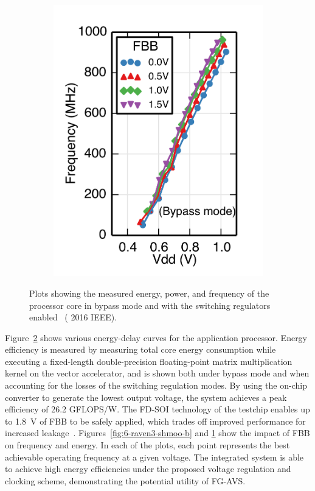 \documentclass[graybox]{svmult}
\begin{document}
\begin{figure}
\begin{subfigure}[t]{0.23\textwidth}
  \includegraphics[width=\textwidth]{6-raven3-shmoo-d}
  \caption{}
  \label{fig:6-raven3-shmoo-d}
  \end{subfigure}
  \hspace*{\fill}
  \caption{Plots showing the measured energy, power, and frequency of the processor core in bypass mode and with the switching regulators enabled~\cite{Zimmer2016} ({\textcopyright} 2016 IEEE).}
  \label{fig:6-raven3-shmoo}
\end{figure}

Figure~\ref{fig:6-raven3-shmoo} shows various energy-delay curves for the application processor.
Energy efficiency is measured by measuring total core energy consumption while executing a fixed-length double-precision floating-point matrix multiplication kernel on the vector accelerator, and is shown both under bypass mode and when accounting for the losses of the switching regulation modes.
By using the on-chip converter to generate the lowest output voltage, the system achieves a peak efficiency of 26.2 GFLOPS/W.
The FD-SOI technology of the testchip enables up to \SI{1.8}{\volt} of FBB to be safely applied, which trades off improved performance for increased leakage~\cite{Jacquet2014}.
Figures~\ref{fig:6-raven3-shmoo-b} and \ref{fig:6-raven3-shmoo-d} show the impact of FBB on frequency and energy.
In each of the plots, each point represents the best achievable operating frequency at a given voltage.
The integrated system is able to achieve high energy efficiencies under the proposed voltage regulation and clocking scheme, demonstrating the potential utility of FG-AVS.
\end{document}
